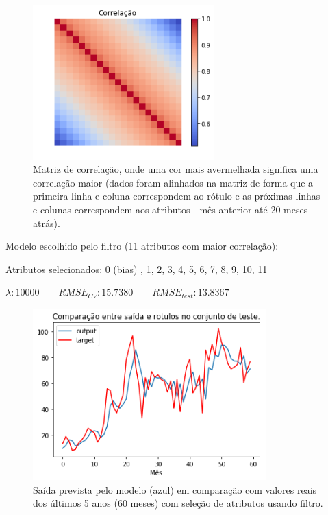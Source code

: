 \documentclass[a4paper, 12pt]{article}
\begin{document}
\begin{figure}[h!]
    \centering
    \includegraphics[width=7cm]{images/corr.png}
    \caption{Matriz de correlação, onde uma cor mais avermelhada significa uma correlação maior (dados foram alinhados na matriz de forma que a primeira linha e coluna correspondem ao rótulo e as próximas linhas e colunas correspondem aos atributos - mês anterior até 20 meses atrás).}
\end{figure}

Modelo escolhido pelo filtro (11 atributos com maior correlação):

Atributos selecionados: 0 (bias) , 1, 2, 3, 4, 5, 6, 7, 8, 9, 10, 11

$\lambda: 10000 \quad\quad RMSE_{CV}: 15.7380 \quad\quad RMSE_{test}: 13.8367$

\begin{figure}[h!]
    \centering
  \includegraphics[width=9cm]{images/filter.png}
    \caption{Saída prevista pelo modelo (azul) em comparação com valores reais dos últimos 5 anos (60 meses) com seleção de atributos usando filtro.}
\end{figure}
\end{document}
